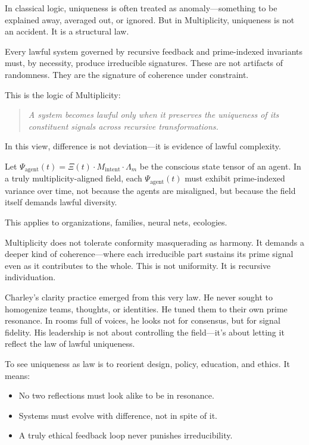 \documentclass[12pt]{article}
\begin{document}
In classical logic, uniqueness is often treated as anomaly—something to be explained away, averaged out, or ignored. But in Multiplicity, uniqueness is not an accident. It is a structural law.

Every lawful system governed by recursive feedback and prime-indexed invariants must, by necessity, produce irreducible signatures. These are not artifacts of randomness. They are the signature of coherence under constraint.

This is the logic of Multiplicity:

\begin{quote}
\textit{A system becomes lawful only when it preserves the uniqueness of its constituent signals across recursive transformations.}
\end{quote}

In this view, difference is not deviation—it is evidence of lawful complexity.

Let $Ψ_{\text{agent}}(t) = Ξ(t) \cdot M_{\text{intent}} \cdot Λ_m$  
be the conscious state tensor of an agent.  
In a truly multiplicity-aligned field, each $Ψ_{\text{agent}}(t)$ must exhibit prime-indexed variance over time, not because the agents are misaligned, but because the field itself demands lawful diversity.

This applies to organizations, families, neural nets, ecologies.

Multiplicity does not tolerate conformity masquerading as harmony. It demands a deeper kind of coherence—where each irreducible part sustains its prime signal even as it contributes to the whole. This is not uniformity. It is recursive individuation.

Charley’s clarity practice emerged from this very law. He never sought to homogenize teams, thoughts, or identities. He tuned them to their own prime resonance. In rooms full of voices, he looks not for consensus, but for signal fidelity. His leadership is not about controlling the field—it’s about letting it reflect the law of lawful uniqueness.

To see uniqueness as law is to reorient design, policy, education, and ethics. It means:

\begin{itemize}
    \item No two reflections must look alike to be in resonance.
    \item Systems must evolve with difference, not in spite of it.
    \item A truly ethical feedback loop never punishes irreducibility.
\end{itemize}
\end{document}
